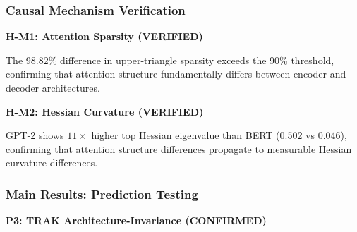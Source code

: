 
\subsubsection{Causal Mechanism Verification}

\textbf{H-M1: Attention Sparsity (VERIFIED)}

\begin{table}[htbp]
\centering
{}
\end{table}

The 98.82\% difference in upper-triangle sparsity exceeds the 90\% threshold, confirming that attention structure fundamentally differs between encoder and decoder architectures.

\textbf{H-M2: Hessian Curvature (VERIFIED)}

\begin{table}[htbp]
\centering
{}
\end{table}

GPT-2 shows $11\times$ higher top Hessian eigenvalue than BERT (0.502 vs 0.046), confirming that attention structure differences propagate to measurable Hessian curvature differences.

\subsubsection{Main Results: Prediction Testing}

\textbf{P3: TRAK Architecture-Invariance (CONFIRMED)}

\begin{table}[htbp]
\centering
{}
\end{table}

